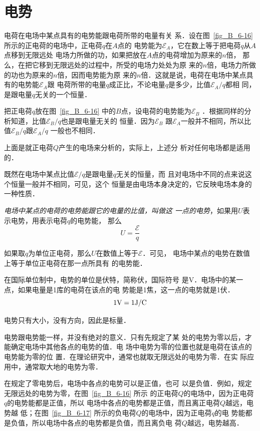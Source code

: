 \section{电势}
电荷在电场中某点具有的电势能跟电荷所带的电量有关
系．设在图~\ref{fig_B_6-16} 所示的正电荷的电场中，正电荷$q$在$A$点的
电势能为$\mathcal{E}_A$，它在数上等于把电荷$q$从$A$点移到无限远处
电场力所做的功，如果把放在$A$点的电荷增加为原来的$n$倍，
那么，在把它移到无限远处的过程中，所受的电场力处处为原
来的$n$倍，电场力所做的功也为原来的$n$倍，因而电势能为原
来的$n$倍．这就是说，电荷在电场中某点具有的电势能$\mathcal{E}_A$跟
电荷所带的电量$q$成正比，不论电量$q$是多少，比值$\mathcal{E}_A/q$都相
同，是跟电量$q$无关的一个恒量．

把正电荷$q$放在图~\ref{fig_B_6-16} 中的$B$点，设电荷的电势能为$\mathcal{E}_B$
．根据同样的分析知道，比值$\mathcal{E}_B/q$也是跟电量无关的
恒量．因为$\mathcal{E}_B$
跟$\mathcal{E}_A$一般并不相同，所以比值$\mathcal{E}_B/q$跟$\mathcal{E}_A/q$
一般也不相同．

上面是就正电荷$Q$产生的电场来分析的，实际上，上述分
析对任何电场都是适用的．

既然在电场中某点比值$\mathcal{E}/q$是跟电量$q$无关的恒量，而
且对电场中不同的点来说这个恒量一般并不相同，可见，这个
恒量是由电场本身决定的，它反映电场本身的一种性质．

\textit{电场中某点的电荷的电势能跟它的电量的比值，叫做这
一点的电势}，如果用$U$表示电势，用表示电荷$q$的电势能，
那么
\[U=\frac{\mathcal{E}}{q} \]

如果取$q$为单位正电荷，那么$U$在数值上等于$\mathcal{E}$．可见，
电场中某点的电势在数值上等于单位正电荷在那一点所具有
的电势能．

在国际单位制中，电势的单位是伏特，简称伏，国际符号
是V．电场中的某一点，如果电量是1库的电荷在该点的电
势能是1焦，这一点的电势就是1伏．
\[ 1{\rm V}=1{\rm J}/{\rm C} \]

电势只有大小，没有方向，因此是标量．

电势跟电势能一样，并没有绝对的意义．只有先规定了某
处的电势为零以后，才能确定电场中其他各点的电势的值．电
场中电势为零的位置也就是电荷在该点的电势能为零的位
置．在理论研究中，通常也就取无限远处的电势为零．在实
际应用中，通常取大地的电势为零．

在规定了零电势后，电场中各点的电势可以是正值，也可
以是负值．例如，规定无限远处的电势为零，在图~\ref{fig_B_6-16} 所示
的正电荷$Q$的电场中，因为正电荷$q$的电势能都是正值，所以
电场中各点的电势都是正值，而且离正电荷$Q$越远，电势越
低；在图~\ref{fig_B_6-17} 所示的负电荷$Q$的电场中，因为正电荷$q$的电
势能都是负值，所以电场中各点的电势都是负值，而且离负电
荷$Q$越远，电势越高．

